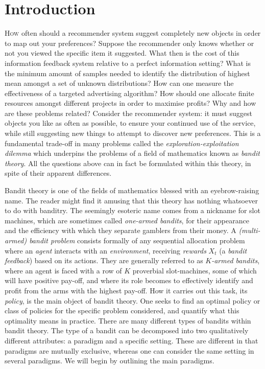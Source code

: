 \chapter*{Introduction}
\lettrine[lines=4]{\textcolor{dropcap}{H}}{ow} often should a recommender system suggest completely new objects in order to map out your preferences? Suppose the recommender only knows whether or not you viewed the specific item it suggested. What then is the cost of this information feedback system relative to a perfect information setting? What is the minimum amount of samples needed to identify the distribution of highest mean amongst a set of unknown distributions? How can one measure the effectiveness of a targeted advertising algorithm? How should one allocate finite resources amongst different projects in order to maximise profits?  Why and how are these problems related? Consider the recommender system: it must suggest objects you like as often as possible, to ensure your continued use of the service, while still suggesting new things to attempt to discover new preferences. This is a fundamental trade-off in many problems called the {\em exploration-exploitation dilemma} which underpins the problems of a field of mathematics known as {\em bandit theory}. All the questions above can in fact be formulated within this theory, in spite of their apparent differences. 

\par Bandit theory is one of the fields of mathematics blessed with an eyebrow-raising name. The reader might find it amusing that this theory has nothing whatsoever to do with banditry.  The seemingly esoteric name comes from a nickname for slot machines, which are sometimes called {\em one-armed bandits}, for their appearance and the efficiency with which they separate gamblers from their money. A {\em (multi-armed) bandit problem} consists formally of any sequential allocation problem where an {\em agent} interacts with an {\em environment}, receiving {\em rewards} $X_t$ (a {\em bandit feedback}) based on its actions. They are generally referred to as {\em $K$-armed bandits}, where an agent is faced with a row of $K$ proverbial slot-machines, some of which will have positive pay-off, and where its role becomes to effectively identify and profit from the arms with the highest pay-off. How it carries out this task, its {\em policy}, is the main object of bandit theory. One seeks to find an optimal policy or class of policies for the specific problem considered, and quantify what this optimality means in practice. There are many different types of bandits within bandit theory. The type of a bandit can be decomposed into two qualitatively different attributes: a paradigm and a specific setting. These are different in that paradigms are mutually exclusive, whereas one can consider the same setting in several paradigms. We will begin by outlining the main paradigms. 

